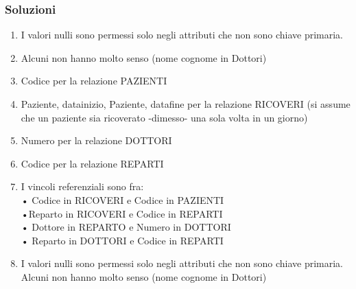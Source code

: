 \subsubsection{Soluzioni}
\begin{enumerate}
    \item I valori nulli sono permessi solo negli attributi che non sono chiave primaria.
    \item Alcuni non hanno molto senso (nome cognome in Dottori) 
    \item Codice per la relazione PAZIENTI
    \item {Paziente, datainizio}, {Paziente, datafine} per la relazione RICOVERI (si assume che un paziente sia ricoverato -dimesso- una sola volta in un giorno)
    \item Numero per la relazione DOTTORI
    \item Codice per la relazione REPARTI
    \item I vincoli referenziali sono fra:
    \\• Codice in RICOVERI e Codice in PAZIENTI
    \\•Reparto in RICOVERI e Codice in REPARTI
    \\• Dottore in REPARTO e Numero in DOTTORI
    \\• Reparto in DOTTORI e Codice in REPARTI
    \item I valori nulli sono permessi solo negli attributi che non sono chiave primaria. Alcuni non hanno molto senso (nome cognome in Dottori)
\end{enumerate}

